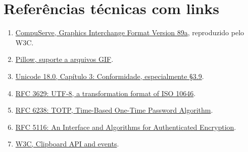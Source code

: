 \documentclass[
  11pt,
  a4paper,
]{article}
\providecommand{\tightlist}{%
  \setlength{\itemsep}{0pt}\setlength{\parskip}{0pt}}
\begin{document}
\hypertarget{referuxeancias-tuxe9cnicas-com-links}{%
\section{Referências técnicas com
links}\label{referuxeancias-tuxe9cnicas-com-links}}

\begin{enumerate}
\def\labelenumi{\arabic{enumi}.}
\tightlist
\item
  \href{https://www.w3.org/Graphics/GIF/spec-gif89a.txt}{CompuServe,
  Graphics Interchange Format Version 89a}, reproduzido pelo W3C.
\item
  \href{https://pillow.readthedocs.io/en/stable/handbook/image-file-formats.html\#gif}{Pillow,
  suporte a arquivos GIF}.
\item
  \href{https://www.unicode.org/versions/Unicode18.0.0/core-spec/chapter-3/}{Unicode
  18.0, Capítulo 3: Conformidade, especialmente §3.9}.
\item
  \href{https://www.rfc-editor.org/rfc/rfc3629.html}{RFC 3629: UTF-8, a
  transformation format of ISO 10646}.
\item
  \href{https://www.rfc-editor.org/rfc/rfc6238.html}{RFC 6238: TOTP,
  Time-Based One-Time Password Algorithm}.
\item
  \href{https://www.rfc-editor.org/rfc/rfc5116.html}{RFC 5116: An
  Interface and Algorithms for Authenticated Encryption}.
\item
  \href{https://www.w3.org/TR/clipboard-apis/}{W3C, Clipboard API and
  events}.
\end{enumerate}
\end{document}
